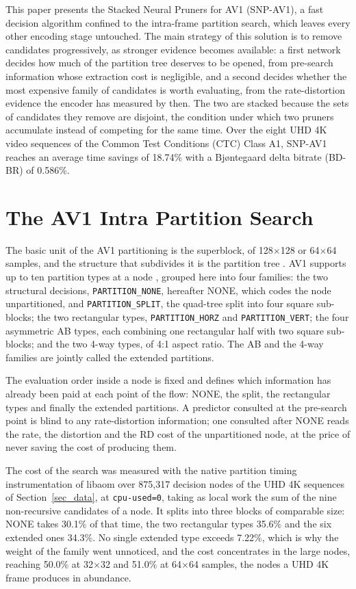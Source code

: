 \documentclass[conference]{IEEEtran}
\begin{document}
This paper presents the Stacked Neural Pruners for AV1 (SNP-AV1), a fast decision
algorithm confined to the intra-frame partition search, which leaves every other
encoding stage untouched. The main strategy of this solution is to remove
candidates progressively, as stronger evidence becomes available: a first network
decides how much of the partition tree deserves to be opened, from pre-search
information whose extraction cost is negligible, and a second decides whether the
most expensive family of candidates is worth evaluating, from the
rate-distortion evidence the encoder has measured by then. The two are stacked
because the sets of candidates they remove are disjoint, the condition under
which two pruners accumulate instead of competing for the same time. Over the
eight UHD 4K video sequences of the Common Test Conditions (CTC) Class A1,
SNP-AV1 reaches an average time savings of 18.74\% with a Bj{\o}ntegaard delta
bitrate (BD-BR) of 0.586\%.

\section{The AV1 Intra Partition Search}
\label{sec_shapes}

The basic unit of the AV1 partitioning is the superblock, of 128$\times$128 or
64$\times$64 samples, and the structure that subdivides it is the partition tree
\cite{han2021}. AV1 supports up to ten partition types at a node \cite{chen2018},
grouped here into four families: the two structural decisions,
\texttt{PARTITION\_NONE}, hereafter NONE, which codes the node unpartitioned, and
\texttt{PARTITION\_SPLIT}, the quad-tree split into four square sub-blocks; the two
rectangular types, \texttt{PARTITION\_HORZ} and \texttt{PARTITION\_VERT}; the four
asymmetric AB types, each combining one rectangular half with two square
sub-blocks; and the two 4-way types, of 4:1 aspect ratio. The AB and the 4-way
families are jointly called the extended partitions.

The evaluation order inside a node is fixed and defines which information has
already been paid at each point of the flow: NONE, the split, the rectangular
types and finally the extended partitions. A predictor consulted at the
pre-search point is blind to any rate-distortion information; one consulted after
NONE reads the rate, the distortion and the RD cost of the unpartitioned node, at
the price of never saving the cost of producing them.

The cost of the search was measured with the native partition timing
instrumentation of libaom over 875{,}317 decision nodes of the UHD 4K sequences of
Section~\ref{sec_data}, at \texttt{cpu-used=0}, taking as local work the sum of
the nine non-recursive candidates of a node. It splits into three blocks of
comparable size: NONE takes 30.1\% of that time, the two rectangular types 35.6\%
and the six extended ones 34.3\%. No single extended type exceeds 7.22\%, which is
why the weight of the family went unnoticed, and the cost concentrates in the
large nodes, reaching 50.0\% at 32$\times$32 and 51.0\% at 64$\times$64 samples,
the nodes a UHD 4K frame produces in abundance.
\end{document}
